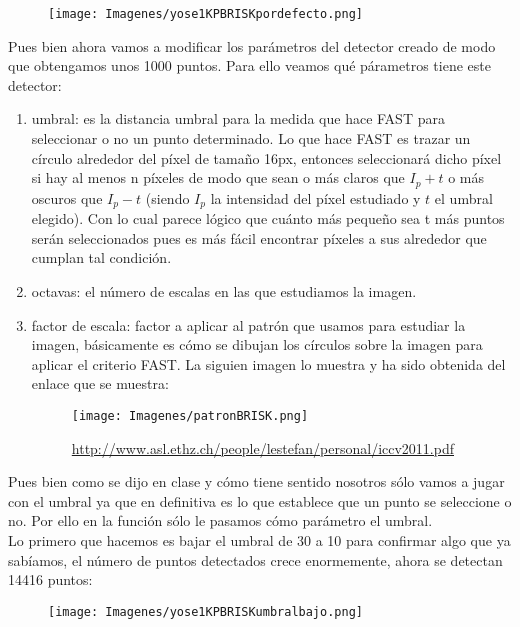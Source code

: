 \documentclass[10pt,a4paper]{article}
\begin{document}
\begin{figure}[H]
\centering
\texttt{[image: Imagenes/yose1KPBRISKpordefecto.png]}
\end{figure}

Pues bien ahora vamos a modificar los parámetros del detector creado de modo que obtengamos unos 1000 puntos. Para ello veamos qué párametros tiene este detector:\\

\begin{enumerate}
\item umbral: es la distancia umbral para la medida que hace FAST para seleccionar o no un punto determinado. Lo que hace FAST es trazar un círculo alrededor del píxel de tamaño 16px, entonces seleccionará dicho píxel si hay al menos n píxeles de modo que sean o más claros que $I_p+t$ o más oscuros que $I_p-t$ (siendo $I_p$ la intensidad del píxel estudiado y $t$ el umbral elegido). Con lo cual parece lógico que cuánto más pequeño sea t más puntos serán seleccionados pues es más fácil encontrar píxeles a sus alrededor que cumplan tal condición.
\item octavas: el número de escalas en las que estudiamos la imagen.
\item factor de escala: factor a aplicar al patrón que usamos para estudiar la imagen, básicamente es cómo se dibujan los círculos sobre la imagen para aplicar el criterio FAST. La siguien imagen lo muestra y ha sido obtenida del enlace que se muestra:\\

\begin{figure}[H]
\centering
\texttt{[image: Imagenes/patronBRISK.png]}
\caption{\url{http://www.asl.ethz.ch/people/lestefan/personal/iccv2011.pdf}}
\end{figure}
\end{enumerate}

Pues bien como se dijo en clase y cómo tiene sentido nosotros sólo vamos a jugar con el umbral ya que en definitiva es lo que establece que un punto se seleccione o no. Por ello en la función sólo le pasamos cómo parámetro el umbral.\\

Lo primero que hacemos es bajar el umbral de 30 a 10 para confirmar algo que ya sabíamos, el número de puntos detectados crece enormemente, ahora se detectan 14416 puntos:\\

\begin{figure}[H]
\centering
\texttt{[image: Imagenes/yose1KPBRISKumbralbajo.png]}
\end{figure}
\end{document}
